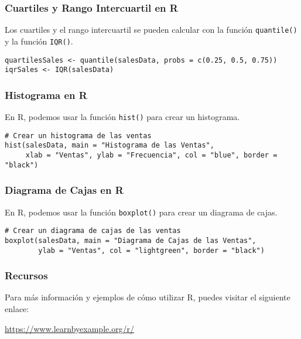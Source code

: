\documentclass[aspectratio=169]{beamer}
\begin{document}
\begin{frame}[fragile]
\frametitle{Cuartiles y Rango Intercuartil en R}
Los cuartiles y el rango intercuartil se pueden calcular con la función \texttt{quantile()} y la función \texttt{IQR()}.

\begin{verbatim}
quartilesSales <- quantile(salesData, probs = c(0.25, 0.5, 0.75))
iqrSales <- IQR(salesData)
\end{verbatim}
\end{frame}




\begin{frame}[fragile]
\frametitle{Histograma en R}
En R, podemos usar la función \texttt{hist()} para crear un histograma.

\begin{verbatim}
# Crear un histograma de las ventas
hist(salesData, main = "Histograma de las Ventas", 
     xlab = "Ventas", ylab = "Frecuencia", col = "blue", border = "black")
\end{verbatim}

\end{frame}

\begin{frame}[fragile]
\frametitle{Diagrama de Cajas en R}
En R, podemos usar la función \texttt{boxplot()} para crear un diagrama de cajas.

\begin{verbatim}
# Crear un diagrama de cajas de las ventas
boxplot(salesData, main = "Diagrama de Cajas de las Ventas", 
        ylab = "Ventas", col = "lightgreen", border = "black")
\end{verbatim}



\end{frame}


\begin{frame}
\frametitle{Recursos}
Para más información y ejemplos de cómo utilizar R, puedes visitar el siguiente enlace:

\url{https://www.learnbyexample.org/r/}
\end{frame}
\end{document}
